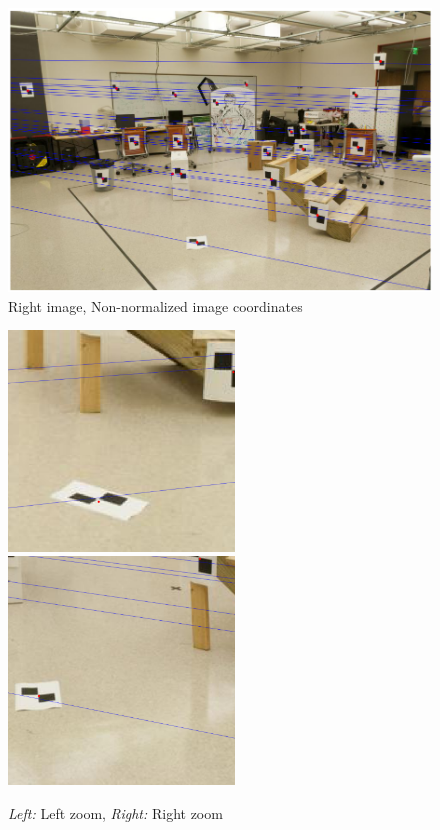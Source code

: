 \documentclass[11pt]{article}
\begin{document}
\begin{figure}[H]
    \centering
    \includegraphics[width=15cm]{images/part2/non-normalize_1_right.png}
    \caption{Right image, Non-normalized image coordinates}
\end{figure}

\begin{figure}[H]
    \centering
    \includegraphics[width=6cm]{images/part2/non-normalize_1_left_zoom.png}
    \includegraphics[width=6cm]{images/part2/non-normalize_1_right_zoom.png}
    \caption{\emph{Left:} Left zoom, \emph{Right:} Right zoom}
\end{figure}
\end{document}
